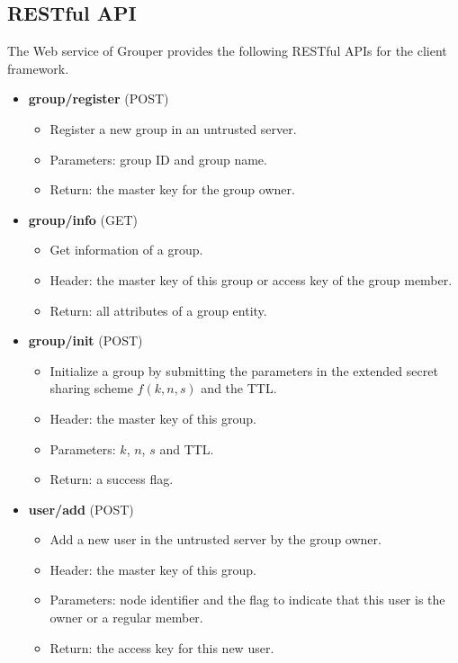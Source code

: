 \documentclass[a4paper,11pt]{report}
\begin{document}
\subsection{RESTful API}

The Web service of Grouper provides the following RESTful APIs for the client framework.

\begin{itemize}[leftmargin=7mm]
	\setlength{\itemsep}{1pt}
	\setlength{\parskip}{0pt}
	\setlength{\parsep}{0pt}
	\item 
	\textbf{group/register} (POST)
	\begin{itemize}
		\item Register a new group in an untrusted server.
		\item Parameters: group ID and group name.
		\item Return: the master key for the group owner. 
	\end{itemize}
	\item 
	\textbf{group/info} (GET)
	\begin{itemize}
		\item Get information of a group.
		\item Header: the master key of this group or access key of the group member.
		\item Return: all attributes of a group entity. 
	\end{itemize}
	\item 
	\textbf{group/init} (POST)
	\begin{itemize}
		\item Initialize a group by submitting the parameters in the extended secret sharing scheme $f(k, n, s)$ and the TTL.
		\item Header: the master key of this group.
		\item Parameters: $k$, $n$, $s$ and TTL.
		\item Return: a success flag.
	\end{itemize}
	\item 
	\textbf{user/add} (POST)
	\begin{itemize}
		\item Add a new user in the untrusted server by the group owner.
		\item Header: the master key of this group.
		\item Parameters: node identifier and the flag to indicate that this user is the owner or a regular member.
		\item Return: the access key for this new user.
	\end{itemize}

\end{itemize}
\end{document}

